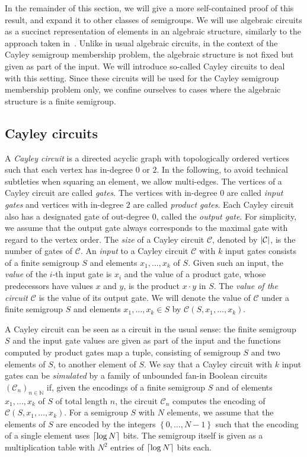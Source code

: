 \documentclass[11pt]{article}
\numberwithin{equation}{section}
\theoremstyle{definition}
\theoremstyle{plain}
\newcommand{\C}{\mathbb C}
\newcommand{\N}{\mathbb N}
\newcommand{\abs}[1]{\ensuremath\left|#1\right|}
\newcommand{\ceil}[1]{\ensuremath\left\lceil#1\right\rceil}
\newcommand{\os}[1]{\ensuremath{\left\{#1\right\}}}
\renewcommand{\C}{\ensuremath{\mathcal{C}}}
\newcommand{\SCSM}{Cayley semigroup membership}
\newcommand{\SCSMP}{{\SCSM} problem}
\begin{document}
In the remainder of this section, we will give a more self-contained proof of
this result, and expand it to other classes of semigroups.
%
We will use algebraic circuits as a succinct representation of elements in an
algebraic structure, %
similarly  %
to the approach taken in~\cite{BabaiS84}.
%
Unlike in usual algebraic circuits, in the context of the {\SCSMP}, the
algebraic structure is not fixed but given as part of the input.
%
We will introduce so-called Cayley circuits to deal with this setting.
%
Since these circuits will be used for the {\SCSMP} only, we confine ourselves
to cases where the algebraic structure is a finite semigroup.

\subsection{Cayley circuits}

A \emph{Cayley circuit} is a directed acyclic graph with topologically ordered
vertices such that each vertex has in-degree $0$ or $2$.
%
In the following, to avoid technical subtleties when squaring an element, we
allow multi-edges.
%
The vertices of a Cayley circuit are called \emph{gates}. The vertices with
in-degree $0$ are called \emph{input gates} and vertices with in-degree $2$ are
called \emph{product gates}. Each Cayley circuit also has a designated gate of
out-degree $0$, called the \emph{output gate}. For simplicity, we assume that
the output gate always corresponds to the maximal gate with regard to the
vertex order.
%
The \emph{size} of a Cayley circuit $\C$, denoted by $\abs{\C}$, is the number
of gates of $\C$.
%
An \emph{input} to a Cayley circuit $\C$ with $k$ input gates consists of a
finite semigroup $S$ and elements $x_1, \dots, x_k$ of $S$.
%
Given such an input, the \emph{value} of the $i$-th input gate is $x_i$ and the
value of a product gate, whose predecessors have values $x$ and $y$, is the
product $x \cdot y$ in $S$. The \emph{value of the circuit $\C$} is the value
of its output gate.
%
We will denote the value of $\C$ under a finite semigroup $S$ and elements
$x_1, \dots, x_k \in S$ by $\C(S, x_1, \dots, x_k)$.

A Cayley circuit can be seen as a circuit in the usual sense: the finite
semigroup $S$ and the input gate values are given as part of the input and the
functions computed by product gates map a tuple, consisting of semigroup $S$
and two elements of $S$, to another element of $S$.
%
We say that a Cayley circuit with $k$ input gates can be \emph{simulated} by a
family of unbounded fan-in Boolean circuits $(\C_n)_{n \in \N}$ if, given the
encodings of a finite semigroup $S$ and of elements $x_1, \dots, x_k$ of $S$ of
total length $n$, the circuit $\C_n$ computes the encoding of $\C(S, x_1,
\dots, x_k)$.
%
For a semigroup $S$ with $N$ elements, we assume that the elements of $S$ are
encoded by the integers $\os{0, \dots, N-1}$ such that the encoding of a single
element uses $\ceil{\log N}$ bits. The semigroup itself is given as a
multiplication table with $N^2$ entries of $\ceil{\log N}$ bits each.
\end{document}
